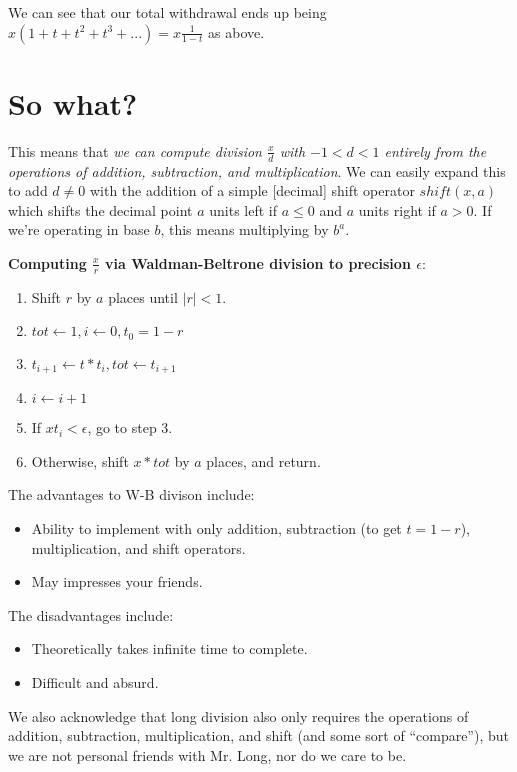 \documentclass[11pt, oneside]{article} 	%
\begin{document}
We can see that our total withdrawal ends up being $x(1+t+t^2 + t^3 + ...) = x\frac{1}{1-t}$ as above.

\section{So what?}


This means that \emph{we can compute division $\frac{x}{d}$ with  $-1 < d < 1$ entirely from the operations of addition, subtraction, and multiplication}.  We can easily expand this to add $d \neq 0$ with the addition of a simple [decimal] shift operator  $shift(x, a)$ which shifts the decimal point $a$ units left if $a \leq 0$  and $a$ units right if $a > 0$.  If we're operating in base $b$, this means  multiplying by $b^a$.

\textbf{Computing $\frac{x}{r}$ via Waldman-Beltrone division to precision $\epsilon$}:
\begin{enumerate}
\item Shift $r$ by $a$ places until $|r| < 1$.
\item $tot \leftarrow 1, i \leftarrow 0, t_0 = 1-r$
\item $t_{i+1} \leftarrow t*t_{i}, tot \leftarrow t_{i+1}$
\item $i \leftarrow i+1$
\item If $xt_{i} < \epsilon$, go to step 3. 
\item Otherwise, shift $x * tot$ by $a$ places, and return.
\end{enumerate}

The advantages to W-B divison include:
\begin{itemize}
\item Ability to implement with only addition, subtraction (to get $t=1-r$), multiplication, and shift operators.
\item May impresses your friends.
\end{itemize}

The disadvantages include:
\begin{itemize}
\item Theoretically takes infinite time to complete.
\item Difficult and absurd.
\end{itemize}

We also acknowledge that long division also only requires the operations of addition, subtraction, multiplication, and shift (and some sort of ``compare''), but we are not personal friends with Mr. Long, nor do we care to be.
\end{document}
